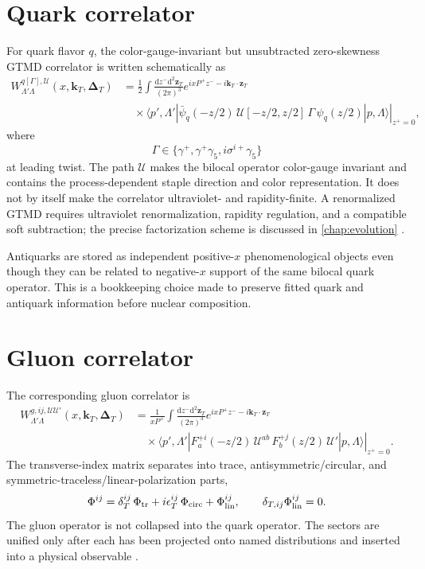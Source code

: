 \documentclass[11pt,oneside]{book}
\newcommand{\kT}{\bm{k}_{T}}
\newcommand{\DeltaT}{\bm{\Delta}_{T}}
\newcommand{\dd}{\mathrm{d}}
\begin{document}
\section{Quark correlator}

For quark flavor $q$, the color-gauge-invariant but unsubtracted zero-skewness GTMD correlator is written schematically as
\begin{align}
 W_{\Lambda'\Lambda}^{q[\Gamma],\mathcal U}(x,\kT,\DeltaT)
 &=\frac12\int\frac{\dd z^-\dd^2\bm z_T}{(2\pi)^3}
 e^{ixP^+z^- -i\kT\cdot\bm z_T}
 \nonumber\\
 &\quad\times
 \left.\langle p',\Lambda'|
 \bar\psi_q(-z/2)\,\mathcal U[-z/2,z/2]\,
 \Gamma\,\psi_q(z/2)
 |p,\Lambda\rangle\right|_{z^+=0},
 \label{eq:quark-gtmd}
\end{align}
where
\begin{equation}
 \Gamma\in\{\gamma^+,\gamma^+\gamma_5,i\sigma^{i+}\gamma_5\}
 \label{eq:quark-leading-projectors}
\end{equation}
at leading twist.  The path $\mathcal U$ makes the bilocal operator color-gauge invariant and contains the process-dependent staple direction and color representation.  It does not by itself make the correlator ultraviolet- and rapidity-finite.  A renormalized GTMD requires ultraviolet renormalization, rapidity regulation, and a compatible soft subtraction; the precise factorization scheme is discussed in \cref{chap:evolution} \cite{MeissnerMetzSchlegel2009,EchevarriaGTMD2016,Collins2011}.

Antiquarks are stored as independent positive-$x$ phenomenological objects even though they can be related to negative-$x$ support of the same bilocal quark operator.  This is a bookkeeping choice made to preserve fitted quark and antiquark information before nuclear composition.

\section{Gluon correlator}

The corresponding gluon correlator is
\begin{align}
 W_{\Lambda'\Lambda}^{g,ij,\mathcal U\mathcal U'}(x,\kT,\DeltaT)
 &=\frac{1}{xP^+}
 \int\frac{\dd z^-\dd^2\bm z_T}{(2\pi)^3}
 e^{ixP^+z^- -i\kT\cdot\bm z_T}
 \nonumber\\
 &\quad\times
 \left.\langle p',\Lambda'|
 F_a^{+i}(-z/2)\,
 \mathcal U^{ab}\,
 F_b^{+j}(z/2)\,
 \mathcal U'
 |p,\Lambda\rangle\right|_{z^+=0}.
 \label{eq:gluon-gtmd}
\end{align}
The transverse-index matrix separates into trace, antisymmetric/circular, and symmetric-traceless/linear-polarization parts,
\begin{equation}
 \Phi^{ij}
 =\delta_T^{ij}\,\Phi_{\rm tr}
 +i\epsilon_T^{ij}\,\Phi_{\rm circ}
 +\Phi_{\rm lin}^{ij},
 \qquad
 \delta_{T,ij}\Phi_{\rm lin}^{ij}=0.
 \label{eq:gluon-matrix-parts}
\end{equation}
The gluon operator is not collapsed into the quark operator.  The sectors are unified only after each has been projected onto named distributions and inserted into a physical observable \cite{MuldersRodrigues2001,BoerEtAl2016}.
\end{document}
